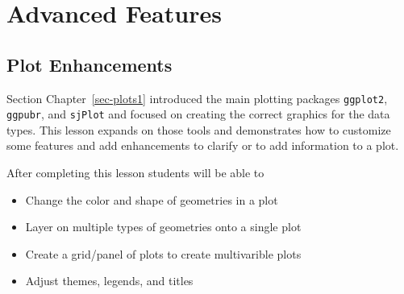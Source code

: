 \documentclass[
  letterpaper,
  DIV=11,
  numbers=noendperiod,
  oneside]{scrreprt}
\providecommand{\tightlist}{%
  \setlength{\itemsep}{0pt}\setlength{\parskip}{0pt}}\usepackage{longtable,booktabs,array}
\begin{document}
\part{Advanced Features}

\chapter{Plot Enhancements}\label{sec-plots2}

Section Chapter~\ref{sec-plots1} introduced the main plotting packages
\texttt{ggplot2}, \texttt{ggpubr}, and \texttt{sjPlot} and focused on
creating the correct graphics for the data types. This lesson expands on
those tools and demonstrates how to customize some features and add
enhancements to clarify or to add information to a plot.

\begin{tcolorbox}[enhanced jigsaw, bottomrule=.15mm, colback=white, colframe=quarto-callout-note-color-frame, toprule=.15mm, coltitle=black, rightrule=.15mm, opacitybacktitle=0.6, colbacktitle=quarto-callout-note-color!10!white, toptitle=1mm, leftrule=.75mm, breakable, bottomtitle=1mm, titlerule=0mm, title={🎓 Learning Objectives}, arc=.35mm, left=2mm, opacityback=0]

After completing this lesson students will be able to

\begin{itemize}
\tightlist
\item
  Change the color and shape of geometries in a plot
\item
  Layer on multiple types of geometries onto a single plot
\item
  Create a grid/panel of plots to create multivarible plots
\item
  Adjust themes, legends, and titles
\end{itemize}

\end{tcolorbox}
\end{document}
